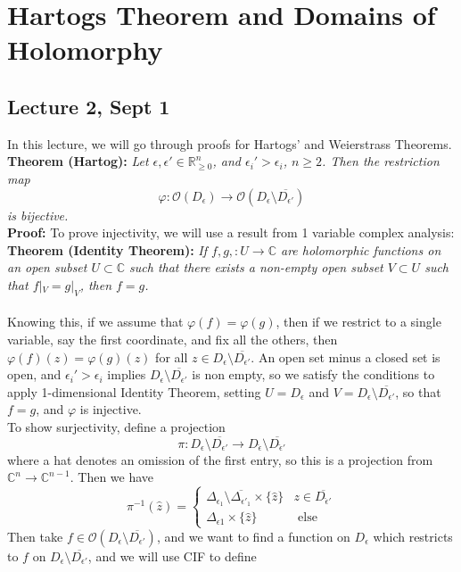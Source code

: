 \documentclass[12pt]{report}
\theoremstyle{definition}
\theoremstyle{remark}
\numberwithin{equation}{section}
\theoremstyle{definition}
\newcommand{\inv}[1]{#1^{-1}}
\newcommand{\bb}[1]{\mathbb{#1}}
\begin{document}
\chapter{Hartogs Theorem and Domains of Holomorphy}
\section*{Lecture 2, Sept 1}
\label{sec:2}
In this lecture, we will go through proofs for Hartogs' and Weierstrass Theorems. \\
\textbf{Theorem (Hartog): }\textit{Let $\epsilon, \epsilon' \in \bb R^n_{\geq 0}$, and $\epsilon_i' > \epsilon_i$, $n \geq 2$. Then the restriction map} 
$$
	\varphi: \mathcal{O}(D_\epsilon) \to \mathcal{O}(D_\epsilon\setminus \overline{D_{\epsilon'}})
$$
\textit{is bijective.}\\
\textbf{Proof: }To prove injectivity, we will use a result from 1 variable complex analysis:\\
\textbf{Theorem (Identity Theorem): }\textit{If $f,g,: U \to \bb C$ are holomorphic functions on an open subset $U \subset \bb C$ such that there exists a non-empty open subset $V \subset U$ such that $f|_V = g|_V$, then $f = g$.}\\\\
Knowing this, if we assume that $\varphi(f) = \varphi(g)$, then if we restrict to a single variable, say the first coordinate, and fix all the others, then $\varphi(f)(z) = \varphi(g)(z)$ for all $z \in D_\epsilon\setminus \overline{D_{\epsilon'}}$. An open set minus a closed set is open, and $\epsilon_i' > \epsilon_i$ implies $D_\epsilon \setminus \overline{D_{\epsilon'}}$ is non empty, so we satisfy the conditions to apply 1-dimensional Identity Theorem, setting $U = D_\epsilon$ and $V =D_\epsilon \setminus \overline{D_{\epsilon'}}$, so that $f = g$, and $\varphi$ is injective. \\
To show surjectivity, define a projection
$$
	\pi: D_\epsilon \setminus \overline{D_{\epsilon'}} \to D_{\hat\epsilon} \setminus \overline{D_{\hat \epsilon'}}
$$
where a hat denotes an omission of the first entry, so this is a projection from $\bb C^n \to \bb C^{n-1}$. Then we have 
$$
	\inv \pi (\hat z) = \begin{cases}
	\Delta_{\epsilon_1}\setminus \overline{\Delta_{\epsilon'_1}} \times \{\hat z\} & z \in \overline{D_{\hat \epsilon'}}\\
	\Delta_{\epsilon 1} \times \{\hat z\} & \text{ else } 
\end{cases}
$$
Then take $f \in \mathcal{O}(D_\epsilon \setminus \overline{D_{\epsilon'}})$, and we want to find a function on $D_\epsilon$ which restricts to $f$ on $D_\epsilon \setminus \overline{D_{\epsilon'}}$, and we will use CIF to define
\end{document}
